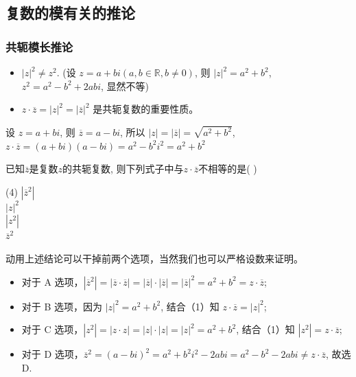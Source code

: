 \vspace{4em}

\subsection{复数的模有关的推论}

\subsubsection{共轭模长推论}

\begin{theorem}[共轭模长推论]
    \begin{itemize}
        \item $|z|^{2}\ne z^{2}$. (设 $z=a+bi(a,b\in \mathbb{R},b\ne0)$, 则 $|z|^{2}=a^{2}+b^{2}$, $z^{2}=a^{2}-b^{2}+2abi$, 显然不等)
        \item  $z\cdot\overline{z}=|z|^{2}=|\overline{z}|^{2}$ 是共轭复数的重要性质。
    \end{itemize}

    \begin{tips}
        设 $z=a+bi$, 则 $\overline{z}=a-bi$, 所以 $|z|=|\overline{z}|=\sqrt{a^{2}+b^{2}}$, $z\cdot\overline{z}=(a+bi)(a-bi)=a^{2}-b^{2}i^{2}=a^{2}+b^{2}$
    \end{tips}
\end{theorem}

\begin{example}
    已知$\overline{z}$是复数$z$的共轭复数, 则下列式子中与$z\cdot\overline{z}$不相等的是( \quad )
    \begin{tasks}(4)
        \task $|\overline{z}^{2}|$ \\
        \task $|z|^{2}$ \\
        \task $|z^{2}|$ \\
        \task $\overline{z}^{2}$
    \end{tasks}
\end{example}

\begin{solution}
    动用上述结论可以干掉前两个选项，当然我们也可以严格设数来证明。
    \begin{itemize}
        \item 对于 A 选项，$|\overline{z}^{2}|=|\overline{z}\cdot\overline{z}|=|\overline{z}|\cdot|\overline{z}|=|\overline{z}|^{2}=a^{2}+b^{2}=z\cdot\overline{z}$;
        \item 对于 B 选项，因为 $|z|^{2}=a^{2}+b^{2}$, 结合（1）知 $z\cdot\overline{z}=|z|^{2}$;
        \item 对于 C 选项，$|z^{2}|=|z\cdot z|=|z|\cdot|z|=|z|^{2}=a^{2}+b^{2}$, 结合（1）知 $|z^{2}|=z\cdot\overline{z}$;
        \item 对于 D 选项，$\overline{z}^{2}=(a-bi)^{2}=a^{2}+b^{2}i^{2}-2abi=a^{2}-b^{2}-2abi\ne z\cdot\overline{z}$, 故选D.
    \end{itemize}
\end{solution}


